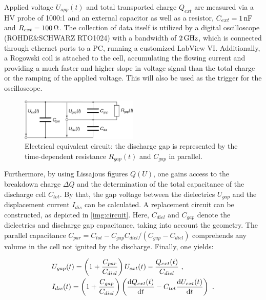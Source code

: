 \documentclass[a4paper,10pt]{article}
\newcommand{\diff}{\textnormal{d}}
\begin{document}
			Applied voltage $U_{app}(t)$ and total transported charge $Q_{ext}$ are measured via a HV probe of 1000:1 and an external capacitor as well as a resistor, $C_{ext}=\unit[1]{nF}$ and $R_{ext}=\unit[100]{\Omega}$. The collection of data itself is utilized by a digital oscilloscope (ROHDE\&SCHWARZ RTO1024) with a bandwidth of $\unit[2]{GHz}$, which is connected through ethernet ports to a PC, running a customized LabView VI. Additionally, a Rogowski coil is attached to the cell, accumulating the flowing current and providing a much faster and higher slope in voltage signal than the total charge or the ramping of the applied voltage. This will also be used as the trigger for the oscilloscope.
			
				\begin{figure}[t]
					\centering
					\includegraphics[width=0.5\textwidth]{figures/experimentalsetup/replacementcircuit.jpg}
					\caption{Electrical equivalent circuit: the discharge gap is represented by the time-dependent resistance $R_{gap}(t)$ and $C_{gap}$ in parallel.}
					\label{img:circuit}
				\end{figure}
			
			 Furthermore, by using Lissajous figures $Q(U)$, one gains access to the breakdown charge $\Delta Q$ and the determination of the total capacitance of the discharge cell $C_{tot}$. By that, the gap voltage between the dielectrics $U_{gap}$ and the displacement current $I_{dis}$ can be calculated. A replacement circuit can be constructed, as depicted in \autoref{img:circuit}. Here, $C_{diel}$ and $C_{gap}$ denote the dielectrics and discharge gap capacitance, taking into account the geometry. The parallel capacitance $C_{par}=C_{tot}-C_{gap}C_{diel}/\left(C_{gap}-C_{diel}\right)$ comprehends any volume in the cell not ignited by the discharge. Finally, one yields:
			 
			 	\begin{align}
					&U_{gap}(t)=\left(1+\frac{C_{par}}{C_{diel}}\right)U_{ext}(t)-\frac{Q_{ext}(t)}{C_{diel}} \nonumber \,\, , \\
					&I_{dis}(t)=\left(1+\frac{C_{gap}}{C_{diel}}\right)\left(\frac{\diff Q_{ext}(t)}{\diff t}-C_{tot}\frac{\diff U_{ext}(t)}{\diff t}\right) \nonumber \,\, .
				\end{align}
\end{document}
